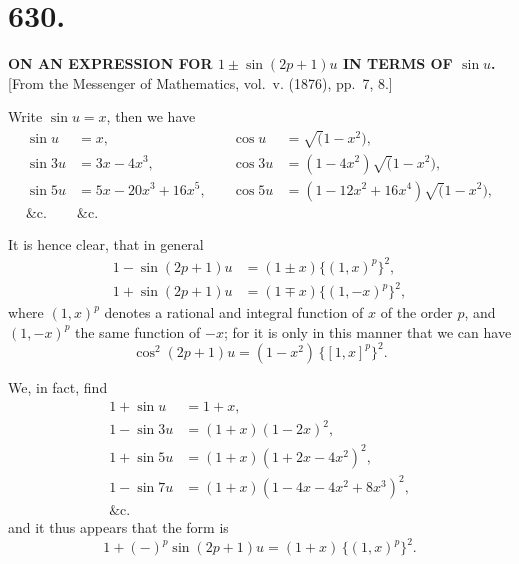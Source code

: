 \documentclass[11pt,a4paper]{book}
\begin{document}
\setcounter{page}{1}

\section*{630.}

\begin{center}
\textbf{ON AN EXPRESSION FOR $1 \pm \sin(2p+1)u$ IN TERMS OF $\sin u$.}\\[1em]
[From the Messenger of Mathematics, vol.~v. (1876), pp.~7, 8.]
\end{center}

Write $\sin u = x$, then we have
\begin{align*}
\sin u &= x, & \cos u &= \surd(1-x^2), \\
\sin 3u &= 3x - 4x^3, & \cos 3u &= (1-4x^2)\surd(1-x^2), \\
\sin 5u &= 5x - 20x^3 + 16x^5,\quad & \cos 5u &= (1-12x^2+16x^4)\surd(1-x^2), \\
\&\text{c.} & \&\text{c.}
\end{align*}

It is hence clear, that in general
\begin{align*}
1 - \sin(2p+1)u &= (1 \pm x)\{(1, x)^p\}^2, \\
1 + \sin(2p+1)u &= (1 \mp x)\{(1, -x)^p\}^2,
\end{align*}
where $(1, x)^p$ denotes a rational and integral function of $x$ of the order $p$, and $(1, -x)^p$ the same function of $-x$; for it is only in this manner that we can have
\[
\cos^2(2p+1)u = (1-x^2)\,\{[1, x]^p\}^2.
\]

We, in fact, find
\begin{align*}
1 + \sin u &= 1+x, \\
1 - \sin 3u &= (1+x)(1-2x)^2, \\
1 + \sin 5u &= (1+x)(1+2x-4x^2)^2, \\
1 - \sin 7u &= (1+x)(1-4x-4x^2+8x^3)^2, \\
\&\text{c.}
\end{align*}
and it thus appears that the form is
\[
1 + (-)^p \sin(2p+1)u = (1+x)\,\{(1, x)^p\}^2.
\]
\end{document}
